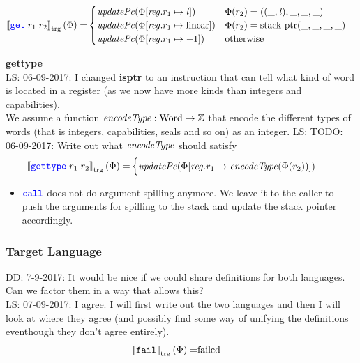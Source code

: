 \documentclass[a4paper]{article}
\newcommand\lau[1]{{\color{purple} \sf \footnotesize {LS: #1}}\\}
\newcommand\dominique[1]{{\color{purple} \sf \footnotesize {DD: #1}}\\}
\newcommand{\sem}[1]{\left\llbracket #1 \right\rrbracket}
\newcommand{\tsem}[2][\Phi]{\sem{#2}_{\mathrm{trg}}(#1)}
\newcommand{\totherwise}{\text{otherwise }}
\newcommand{\sourcecolor}[1]{\color{blue}}
\newcommand{\src}[1]{{\sourcecolor{} #1}}
\newcommand{\targetcolor}[1]{\color{black}}
\newcommand{\trg}[1]{{\targetcolor{} #1}}
\newcommand{\zinstr}[1]{\texttt{#1}}
\newcommand{\twoinstr}[3]{
  \ifthenelse{\equal{#2#3}{}}
  {\zinstr{#1}}
  {\zinstr{#1} \; #2 \; #3}
}
\newcommand{\sisptr}[2]{\twoinstr{\src{gettype}}{#1}{#2}}
\newcommand{\sgetlin}[2]{\twoinstr{\src{get}}{#1}{#2}}
\newcommand{\scall}[2]{\twoinstr{\src{call}}{#1}{#2}}
\newcommand{\tfail}{\zinstr{\trg{fail}}}
\newcommand{\ints}{\mathbb{Z}}
\newcommand{\update}[2]{[#1 \mapsto #2]}
\newcommand{\updReg}[2]{\update{\reg.#1}{#2}}
\newcommand{\shareddom}[1]{\mathrm{#1}}
\newcommand{\Word}{\shareddom{Word}}
\newcommand{\lin}{\var{l}}
\newcommand{\stkptr}[1]{\mathrm{stack\text{-}ptr}(#1)}
\newcommand{\failed}{\mathrm{failed}}
\newcommand{\var}[1]{\mathit{#1}}
\newcommand{\reg}{\var{reg}}
\newcommand{\plainlinearity}[1]{\mathrm{#1}}
\newcommand{\linear}{\plainlinearity{linear}}
\newcommand{\plainfun}[2]{
  \ifthenelse{\equal{#2}{}}
  {\mathit{#1}}
  {\mathit{#1}(#2)}
}
\newcommand{\encType}[1]{\plainfun{encodeType}{#1}}
\newcommand{\updPcAddr}[1]{\plainfun{updatePc}{#1}}
\begin{document}
\begin{align*}
  \tsem{\sgetlin{r_1}{r_2}} = &                              
                              \begin{cases}
                                \updPcAddr{}(\Phi\update{\reg.r_1}{\lin}) & \Phi(r_2) = ((\_,\lin),\_,\_,\_) \\
                                \updPcAddr{\Phi\updReg{r_1}{\linear}} & \Phi(r_2) = \stkptr{\_,\_,\_,\_}\\
                                \updPcAddr{\Phi\updReg{r_1}{-1}} & \totherwise
                              \end{cases}
\end{align*}

\textbf{gettype}\\
\lau{06-09-2017: I changed \textbf{isptr} to an instruction that can tell what kind of word is located in a register (as we now have more kinds than integers and capabilities).}
We assume a function $\encType{} : \Word \rightarrow \ints$ that encode the different types of words (that is integers, capabilities, seals and so on) as an integer.
\lau{TODO: 06-09-2017: Write out what $\encType{}$ should satisfy}
\begin{align*}
  \tsem{\sisptr{r_1}{r_2}} = & 
                               \begin{cases}
                                 \updPcAddr{}(\Phi\updReg{r_1}{\encType{\Phi(r_2)}})
                               \end{cases}
\end{align*}


\begin{itemize}
\item $\scall{}{}$ does not do argument spilling anymore. We leave it to the caller to push the arguments for spilling to the stack and update the stack pointer accordingly.
\end{itemize}

\subsubsection{Target Language}
\dominique{7-9-2017: It would be nice if we could share definitions for both languages.  Can we factor them in a way that allows this?}
\lau{07-09-2017: I agree. I will first write out the two languages and then I will look at where they agree (and possibly find some way of unifying the definitions eventhough they don't agree entirely).}

\begin{align*}
  \tsem{\tfail} = & \failed
\end{align*}
\end{document}
